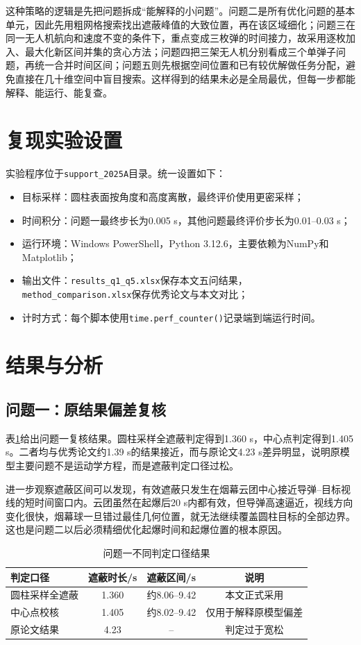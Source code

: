 \documentclass[12pt,a4paper]{article}
\begin{document}
这种策略的逻辑是先把问题拆成“能解释的小问题”。问题二是所有优化问题的基本单元，因此先用粗网格搜索找出遮蔽峰值的大致位置，再在该区域细化；问题三在同一无人机航向和速度不变的条件下，重点变成三枚弹的时间接力，故采用逐枚加入、最大化新区间并集的贪心方法；问题四把三架无人机分别看成三个单弹子问题，再统一合并时间区间；问题五则先根据空间位置和已有较优解做任务分配，避免直接在几十维空间中盲目搜索。这样得到的结果未必是全局最优，但每一步都能解释、能运行、能复查。

\section{复现实验设置}

实验程序位于\verb|support_2025A|目录。统一设置如下：
\begin{itemize}
\item 目标采样：圆柱表面按角度和高度离散，最终评价使用更密采样；
\item 时间积分：问题一最终步长为0.005 s，其他问题最终评价步长为0.01--0.03 s；
\item 运行环境：Windows PowerShell，Python 3.12.6，主要依赖为NumPy和Matplotlib；
\item 输出文件：\verb|results_q1_q5.xlsx|保存本文五问结果，\verb|method_comparison.xlsx|保存优秀论文与本文对比；
\item 计时方式：每个脚本使用\verb|time.perf_counter()|记录端到端运行时间。
\end{itemize}

\section{结果与分析}

\subsection{问题一：原结果偏差复核}

表\ref{tab:q1}给出问题一复核结果。圆柱采样全遮蔽判定得到1.360 s，中心点判定得到1.405 s。二者均与优秀论文约1.39 s的结果接近，而与原论文4.23 s差异明显，说明原模型主要问题不是运动学方程，而是遮蔽判定口径过松。

进一步观察遮蔽区间可以发现，有效遮蔽只发生在烟幕云团中心接近导弹--目标视线的短时间窗口内。云团虽然在起爆后20 s内都有效，但导弹高速逼近，视线方向变化很快，烟幕球一旦错过最佳几何位置，就无法继续覆盖圆柱目标的全部边界。这也是问题二以后必须精细优化起爆时间和起爆位置的根本原因。

\begin{table}[H]
\centering
\caption{问题一不同判定口径结果}
\label{tab:q1}
\begin{tabular}{lccc}
\toprule
判定口径 & 遮蔽时长/s & 遮蔽区间/s & 说明\\
\midrule
圆柱采样全遮蔽 & 1.360 & 约8.06--9.42 & 本文正式采用\\
中心点校核 & 1.405 & 约8.02--9.42 & 仅用于解释原模型偏差\\
原论文结果 & 4.23 & -- & 判定过于宽松\\
\bottomrule
\end{tabular}
\end{table}
\end{document}
